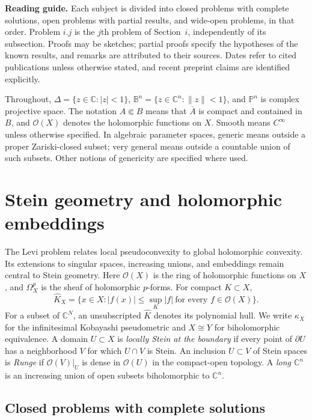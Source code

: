 \documentclass[11pt,reqno]{amsart}
\theoremstyle{definition}
\theoremstyle{remark}
\begin{document}
\medskip
\noindent\textbf{Reading guide.}
Each subject is divided into closed problems with complete solutions, open problems with partial results, and wide-open problems, in that order. Problem $i.j$ is the $j$th problem of Section~$i$, independently of its subsection. Proofs may be sketches; partial proofs specify the hypotheses of the known results, and remarks are attributed to their sources. Dates refer to cited publications unless otherwise stated, and recent preprint claims are identified explicitly.

Throughout, $\Delta=\{z\in\mathbb C:|z|<1\}$, $\mathbb B^n=\{z\in\mathbb C^n:\|z\|<1\}$, and $\mathbb P^n$ is complex projective space. The notation $A\Subset B$ means that $\overline A$ is compact and contained in $B$, and $\mathcal O(X)$ denotes the holomorphic functions on $X$. Smooth means $C^\infty$ unless otherwise specified. In algebraic parameter spaces, generic means outside a proper Zariski-closed subset; very general means outside a countable union of such subsets. Other notions of genericity are specified where used.

\tableofcontents


\section{Stein geometry and holomorphic embeddings}

The Levi problem relates local pseudoconvexity to global holomorphic convexity. Its extensions to singular spaces, increasing unions, and embeddings remain central to Stein geometry. Here $\mathcal O(X)$ is the ring of holomorphic functions on $X$, and $\Omega_X^p$ is the sheaf of holomorphic $p$-forms. For compact $K\subset X$,
\[
 \widehat K_X=\{x\in X:|f(x)|\leq\sup_K|f|\ \text{for every }f\in\mathcal O(X)\}.
\]
For a subset of $\mathbb C^N$, an unsubscripted $\widehat K$ denotes its polynomial hull. We write $\kappa_X$ for the infinitesimal Kobayashi pseudometric and $X\cong Y$ for biholomorphic equivalence. A domain $U\subset X$ is \emph{locally Stein at the boundary} if every point of $\partial U$ has a neighborhood $V$ for which $U\cap V$ is Stein. An inclusion $U\subset V$ of Stein spaces is \emph{Runge} if $\mathcal O(V)|_U$ is dense in $\mathcal O(U)$ in the compact-open topology. A \emph{long $\mathbb C^n$} is an increasing union of open subsets biholomorphic to $\mathbb C^n$.

\subsection{Closed problems with complete solutions}
\end{document}
